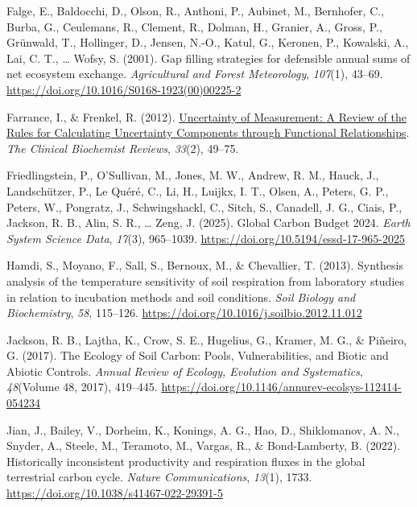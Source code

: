 \documentclass[
  letterpaper,
  DIV=11,
  numbers=noendperiod]{scrartcl}
\newlength{\cslhangindent}
\newenvironment{CSLReferences}[2] %
 {\begin{list}{}{%
  \setlength{\itemindent}{0pt}
  \setlength{\leftmargin}{0pt}
  \setlength{\parsep}{0pt}
  \ifodd #1
   \setlength{\leftmargin}{\cslhangindent}
   \setlength{\itemindent}{-1\cslhangindent}
  \fi
  \setlength{\itemsep}{#2\baselineskip}}}
 {\end{list}}
\begin{document}
\begin{CSLReferences}{1}{0}
Falge, E., Baldocchi, D., Olson, R., Anthoni, P., Aubinet, M.,
Bernhofer, C., Burba, G., Ceulemans, R., Clement, R., Dolman, H.,
Granier, A., Gross, P., Grünwald, T., Hollinger, D., Jensen, N.-O.,
Katul, G., Keronen, P., Kowalski, A., Lai, C. T., \ldots{} Wofsy, S.
(2001). Gap filling strategies for defensible annual sums of net
ecosystem exchange. \emph{Agricultural and Forest Meteorology},
\emph{107}(1), 43--69.
\url{https://doi.org/10.1016/S0168-1923(00)00225-2}

Farrance, I., \& Frenkel, R. (2012).
\href{https://www.ncbi.nlm.nih.gov/pmc/articles/PMC3387884}{Uncertainty
of {Measurement}: {A Review} of the {Rules} for {Calculating Uncertainty
Components} through {Functional Relationships}}. \emph{The Clinical
Biochemist Reviews}, \emph{33}(2), 49--75.

Friedlingstein, P., O'Sullivan, M., Jones, M. W., Andrew, R. M., Hauck,
J., Landschützer, P., Le Quéré, C., Li, H., Luijkx, I. T., Olsen, A.,
Peters, G. P., Peters, W., Pongratz, J., Schwingshackl, C., Sitch, S.,
Canadell, J. G., Ciais, P., Jackson, R. B., Alin, S. R., \ldots{} Zeng,
J. (2025). Global {Carbon Budget} 2024. \emph{Earth System Science
Data}, \emph{17}(3), 965--1039.
\url{https://doi.org/10.5194/essd-17-965-2025}

Hamdi, S., Moyano, F., Sall, S., Bernoux, M., \& Chevallier, T. (2013).
Synthesis analysis of the temperature sensitivity of soil respiration
from laboratory studies in relation to incubation methods and soil
conditions. \emph{Soil Biology and Biochemistry}, \emph{58}, 115--126.
\url{https://doi.org/10.1016/j.soilbio.2012.11.012}

Jackson, R. B., Lajtha, K., Crow, S. E., Hugelius, G., Kramer, M. G., \&
Piñeiro, G. (2017). The {Ecology} of {Soil Carbon}: {Pools},
{Vulnerabilities}, and {Biotic} and {Abiotic Controls}. \emph{Annual
Review of Ecology, Evolution and Systematics}, \emph{48}(Volume 48,
2017), 419--445.
\url{https://doi.org/10.1146/annurev-ecolsys-112414-054234}

Jian, J., Bailey, V., Dorheim, K., Konings, A. G., Hao, D., Shiklomanov,
A. N., Snyder, A., Steele, M., Teramoto, M., Vargas, R., \&
Bond-Lamberty, B. (2022). Historically inconsistent productivity and
respiration fluxes in the global terrestrial carbon cycle. \emph{Nature
Communications}, \emph{13}(1), 1733.
\url{https://doi.org/10.1038/s41467-022-29391-5}


\end{CSLReferences}
\end{document}
